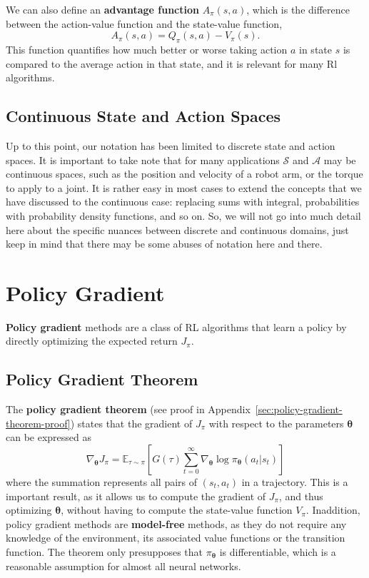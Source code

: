 \documentclass[12pt]{report}
\theoremstyle{definition}
\theoremstyle{remark}
\begin{document}
We can also define an \textbf{advantage function} $A_\pi(s, a)$, which is the difference between the action-value function and the state-value function,
\begin{equation}
    A_\pi(s, a) = Q_\pi(s, a) - V_\pi(s).
\end{equation}
This function quantifies how much better or worse taking action $a$ in state $s$ is compared to the average action in that state, and it is relevant for many Rl algorithms.

\subsection{Continuous State and Action Spaces}
Up to this point, our notation has been limited to discrete state and action spaces. It is important to take note that for many applications $\mathcal{S}$ and $\mathcal{A}$ may be continuous spaces, such as the position and velocity of a robot arm, or the torque to apply to a joint. It is rather easy in most cases to extend the concepts that we have discussed to the continuous case: replacing sums with integral, probabilities with probability density functions, and so on. So, we will not go into much detail here about the specific nuances between discrete and continuous domains, just keep in mind that there may be some abuses of notation here and there.

\section{Policy Gradient}
\textbf{Policy gradient} methods are a class of RL algorithms that learn a policy by directly optimizing the expected return $J_\pi$.

\subsection{Policy Gradient Theorem}
The \textbf{policy gradient theorem} (see proof in Appendix~\ref{sec:policy-gradient-theorem-proof}) states that the gradient of $J_\pi$ with respect to the parameters $\boldsymbol{\theta}$ can be expressed as
\begin{equation}\label{eq:policy-gradient-theorem}
    \nabla_{\boldsymbol{\theta}} J_\pi =  \mathbb{E}_{\tau\sim\pi}\left[G(\tau) \sum_{t=0}^{\infty} \nabla_{\boldsymbol{\theta}} \log \pi_{\boldsymbol{\theta}}(a_t | s_t)\right]
\end{equation}
where the summation represents all pairs of $(s_t, a_t)$ in a trajectory.
This is a important result, as it allows us to compute the gradient of $J_\pi$, and thus optimizing $\boldsymbol{\theta}$, without having to compute the state-value function $V_\pi$. Inaddition, policy gradient methods are \textbf{model-free} methods, as they do not require any knowledge of the environment, its associated value functions or the transition function. The theorem only presupposes that $\pi_{\boldsymbol{\theta}}$ is differentiable, which is a reasonable assumption for almost all neural networks.
\end{document}

